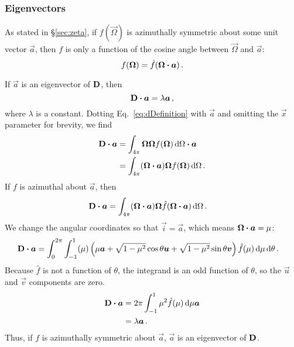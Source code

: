 \subsubsection{Eigenvectors}
As stated in \S\ref{sec:zeta}, if $f(\vec{\Omega})$ is azimuthally
symmetric about some unit vector $\vec{a}$, then $f$ is only a function of the
cosine angle
between $\vec{\Omega}$ and $\vec{a}$:
\begin{equation*}
f(\bm{\Omega}) = \hat f( \bm{\Omega} \bm{\cdot} \bm{a})\,.
\end{equation*}

If $\vec{a}$ is an eigenvector of $\mathbf{D}$, then
\begin{equation*}
  \mathbf{D} \bm{\cdot} \bm{a} = \lambda \bm{a}\,,
\end{equation*}
where $\lambda$ is a constant. Dotting Eq.~\eqref{eq:dDefinition} with
$\vec{a}$ and omitting the $\vec{x}$ parameter for brevity, we find
\begin{align*}
  \mathbf{D} \bm{\cdot} \bm{a}
  &= \int_{4\pi} \bm{\Omega} \bm{\Omega} f(\bm{\Omega}) \mathop{}\!\mathrm{d}\Omega \bm{\cdot} \bm{a}
  \\
  &= \int_{4\pi} (\bm{\Omega} \bm{\cdot} \bm{a}) \bm{\Omega} f(\bm{\Omega}) \mathop{}\!\mathrm{d}\Omega
  \,.
\end{align*}
If $f$ is azimuthal about $\vec{a}$, then
\begin{align*}
  \mathbf{D} \bm{\cdot} \bm{a}
  &= \int_{4\pi} (\bm{\Omega} \bm{\cdot} \bm{a}) \bm{\Omega}
    \hat f(\bm{\Omega} \bm{\cdot} \bm{a}) \mathop{}\!\mathrm{d}\Omega \,.
\end{align*}
We change the angular coordinates so that $\vec{i}=\vec{a}$, which means
$\bm{\Omega} \bm{\cdot} \bm{a}=\mu$:
\begin{align*}
  \mathbf{D} \bm{\cdot} \bm{a}
  &= \int_{0}^{2\pi} \int_{-1}^{1} (\mu)
  \left( \mu \bm{a} + \sqrt{1-\mu^2} \cos \theta \bm{u} + \sqrt{1-\mu^2} \sin
  \theta \bm{v} \right) \hat f(\mu) \mathop{}\!\mathrm{d}\mu \mathop{}\!\mathrm{d}\theta \,.
\end{align*}
Because $\hat f$ is not a function of $\theta$, the integrand is an
odd function of $\theta$, so the $\vec{u}$ and $\vec{v}$ components are zero.
\begin{align*}
  \mathbf{D} \bm{\cdot} \bm{a}
  &= 2\pi \int_{-1}^{1} \mu^2 \hat f(\mu) \mathop{}\!\mathrm{d}\mu \bm{a}
  \\
  &= \lambda \bm{a} \,.
\end{align*}
Thus, if $f$ is azimuthally symmetric about $\vec{a}$, $\vec{a}$ is an
eigenvector of $\mathbf{D}$.

